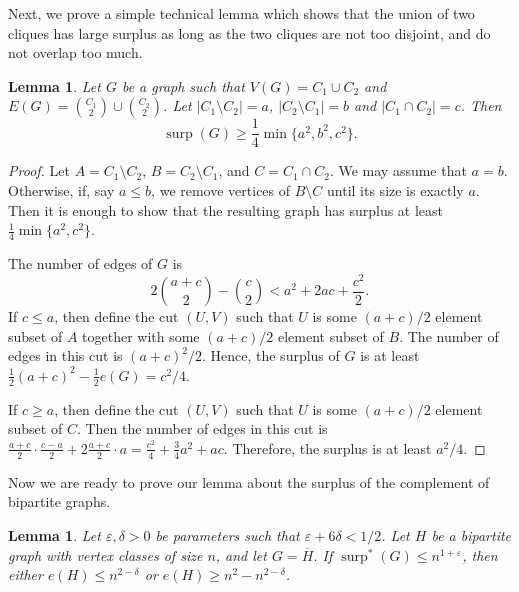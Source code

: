\documentclass[11pt]{article}
\theoremstyle{plain}
\newtheorem{lemma}[theorem]{Lemma}
\theoremstyle{definition}
\DeclareMathOperator{\surp}{surp}
\newcommand{\eps}{\varepsilon}
\begin{document}
Next, we prove a simple technical lemma which shows that the union of two cliques has large surplus as long as the two cliques are not too disjoint, and do not overlap too much. 

\begin{lemma}\label{lemma:union_of_cliques}
Let $G$ be a graph such that $V(G)=C_1\cup C_2$ and $E(G)=\binom{C_1}{2}\cup \binom{C_2}{2}$. Let $|C_1\setminus C_2|=a$, $|C_2\setminus C_1|=b$ and $|C_1\cap C_2|=c$. Then $$\surp(G)\geq \frac{1}{4}\min\{a^2,b^2,c^2\}.$$ 
\end{lemma}

\begin{proof}
Let $A=C_1\setminus C_2$, $B=C_2\setminus C_1$, and $C=C_1\cap C_2$. We may assume that $a=b$. Otherwise, if, say $a\leq b$, we remove vertices of $B\setminus C$ until its size is exactly $a$. Then it is enough to show that the resulting graph has surplus at least $\frac{1}{4}\min\{a^2,c^2\}$.

The number of edges of $G$ is 
$$2\binom{a+c}{2}-\binom{c}{2}< a^2+2ac+\frac{c^2}{2}.$$ 
If $c\leq a$, then define the cut $(U,V)$ such that $U$ is some $(a+c)/2$ element subset of $A$ together with some $(a+c)/2$ element subset of $B$. The number of edges in this cut is $(a+c)^2/2$. Hence, the surplus of $G$ is at least $\frac{1}{2}(a+c)^2-\frac{1}{2}e(G)=c^2/4$.

If $c\geq a$, then define the cut $(U,V)$ such that $U$ is some $(a+c)/2$ element subset of $C$. Then the number of edges in this cut is $\frac{a+c}{2}\cdot \frac{c-a}{2}+2\frac{a+c}{2}\cdot a=\frac{c^2}{4}+\frac{3}{4}a^2+ac$. Therefore, the surplus is at least $a^2/4$.
\end{proof}

Now we are ready to prove our lemma about the surplus of the complement of bipartite graphs.

\begin{lemma}\label{lemma:bipartite_complement}
Let $\eps,\delta>0$ be parameters such that $\eps+6\delta<1/2$. Let $H$ be a bipartite graph with vertex classes of size $n$, and let $G=\overline{H}$. If  $\surp^*(G)\leq n^{1+\eps}$, then either $e(H)\leq n^{2-\delta}$ or $e(H)\geq n^2-n^{2-\delta}$.
\end{lemma}
\end{document}
